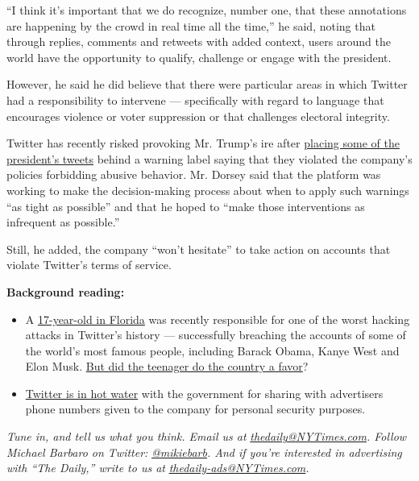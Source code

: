 ``I think it's important that we do recognize, number one, that these
annotations are happening by the crowd in real time all the time,'' he
said, noting that through replies, comments and retweets with added
context, users around the world have the opportunity to qualify,
challenge or engage with the president.

However, he said he did believe that there were particular areas in
which Twitter had a responsibility to intervene --- specifically with
regard to language that encourages violence or voter suppression or that
challenges electoral integrity.

Twitter has recently risked provoking Mr. Trump's ire after
\href{https://www.nytimes3xbfgragh.onion/2020/06/23/technology/trump-twitter-label-seattle.html}{placing
some of the president's tweets} behind a warning label saying that they
violated the company's policies forbidding abusive behavior. Mr. Dorsey
said that the platform was working to make the decision-making process
about when to apply such warnings ``as tight as possible'' and that he
hoped to ``make those interventions as infrequent as possible.''

Still, he added, the company ``won't hesitate'' to take action on
accounts that violate Twitter's terms of service.

\textbf{Background reading:}

\begin{itemize}
\item
  A
  \href{https://www.nytimes3xbfgragh.onion/2020/08/02/technology/florida-teenager-twitter-hack.html}{17-year-old
  in Florida} was recently responsible for one of the worst hacking
  attacks in Twitter's history --- successfully breaching the accounts
  of some of the world's most famous people, including Barack Obama,
  Kanye West and Elon Musk.
  \href{https://www.nytimes3xbfgragh.onion/2020/07/16/us/politics/twitter-hack.html}{But
  did the teenager do the country a favor}?
\item
  \href{https://www.nytimes3xbfgragh.onion/2020/08/04/technology/europe-big-tech.html}{Twitter
  is in hot water} with the government for sharing with advertisers
  phone numbers given to the company for personal security purposes.
\end{itemize}

\emph{Tune in, and tell us what you think. Email us at}
\href{mailto:thedaily@NYTimes.com}{\emph{thedaily@NYTimes.com}}\emph{.
Follow Michael Barbaro on Twitter:}
\href{https://twitter.com/mikiebarb}{\emph{@mikiebarb}}\emph{. And if
you're interested in advertising with ``The Daily,'' write to us at}
\href{mailto:thedaily-ads@NYTimes.com}{\emph{thedaily-ads@NYTimes.com}}\emph{.}


